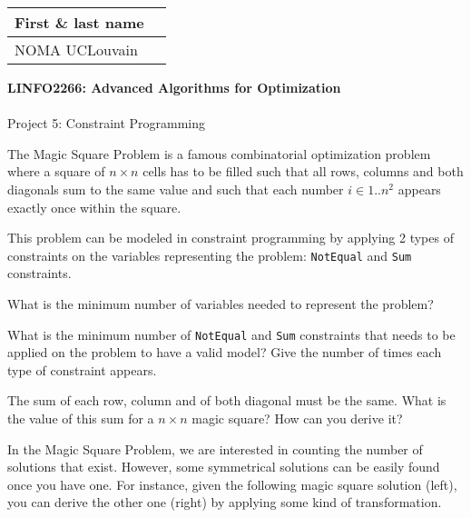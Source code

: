 \documentclass[12pt]{report}
\newcommand{\answerbox}[2]{\hfill\break\\
	\framebox[\linewidth]{\parbox[c][#1][c]{\dimexpr\linewidth-2\fboxsep-2\fboxrule}{#2}}
}
\newcounter{row}
\newcounter{col}
\begin{document}
	\hfill
	\begingroup
	\Large
	\begin{tabular}{|l|p{6cm}|}
		\hline
		First \& last name &
		\\ \hline
		NOMA UCLouvain &
		\\ \hline
	\end{tabular}
	\endgroup
	\vspace{1.5cm}

	\noindent
	\begingroup
	\Large
	\textbf{LINFO2266: Advanced Algorithms for Optimization}\\\\
	Project 5: Constraint Programming
	\endgroup
	\vspace{0.2cm}

	\begin{Exercise}[title={Modeling the Magic Square Problem}]

		The Magic Square Problem is a famous combinatorial optimization problem where a square of $n\times n$ cells has to be filled such that all rows, columns and both diagonals sum to the same value and such that each number $i \in 1..n^2$ appears exactly once within the square.

		This problem can be modeled in constraint programming by applying 2 types of constraints on the variables representing the problem: \texttt{NotEqual} and \texttt{Sum} constraints.

		\Question What is the minimum number of variables needed to represent the problem?
		\answerbox{2cm}{
		}

		\Question What is the minimum number of \texttt{NotEqual} and \texttt{Sum} constraints that needs to be applied on the problem to have a valid model? Give the number of times each type of constraint appears.
		\answerbox{3cm}{
		}

		\Question The sum of each row, column and of both diagonal must be the same. What is the value of this sum for a $n\times n$ magic square? How can you derive it?
		\answerbox{4cm}{
		}

		In the Magic Square Problem, we are interested in counting the number of solutions that exist. However, some symmetrical solutions can be easily found once you have one. For instance, given the following magic square solution (left), you can derive the other one (right) by applying some kind of transformation.

\begin{minipage}{0.4\linewidth}
	\centering
\begin{tikzpicture}[scale=0.8]


\end{tikzpicture}
\end{minipage}
\end{Exercise}
\end{document}
